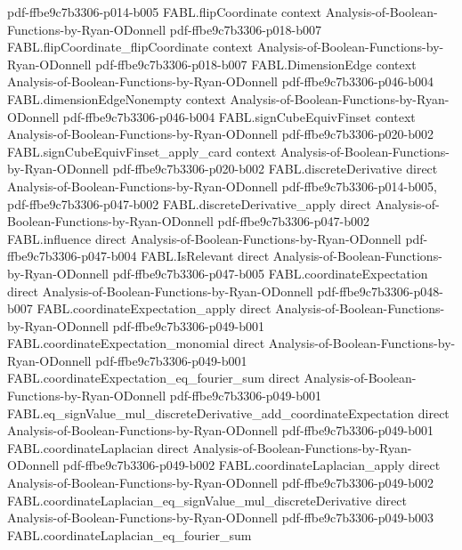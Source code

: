\begin{theorem}
  {pdf-ffbe9c7b3306-p014-b005}
\proofstep
  {FABL.flipCoordinate}
  {context}
  {Analysis-of-Boolean-Functions-by-Ryan-ODonnell}
  {pdf-ffbe9c7b3306-p018-b007}
\proofstep
  {FABL.flipCoordinate_flipCoordinate}
  {context}
  {Analysis-of-Boolean-Functions-by-Ryan-ODonnell}
  {pdf-ffbe9c7b3306-p018-b007}
\proofstep
  {FABL.DimensionEdge}
  {context}
  {Analysis-of-Boolean-Functions-by-Ryan-ODonnell}
  {pdf-ffbe9c7b3306-p046-b004}
\proofstep
  {FABL.dimensionEdgeNonempty}
  {context}
  {Analysis-of-Boolean-Functions-by-Ryan-ODonnell}
  {pdf-ffbe9c7b3306-p046-b004}
\proofstep
  {FABL.signCubeEquivFinset}
  {context}
  {Analysis-of-Boolean-Functions-by-Ryan-ODonnell}
  {pdf-ffbe9c7b3306-p020-b002}
\proofstep
  {FABL.signCubeEquivFinset_apply_card}
  {context}
  {Analysis-of-Boolean-Functions-by-Ryan-ODonnell}
  {pdf-ffbe9c7b3306-p020-b002}
\proofstep
  {FABL.discreteDerivative}
  {direct}
  {Analysis-of-Boolean-Functions-by-Ryan-ODonnell}
  {pdf-ffbe9c7b3306-p014-b005,
    pdf-ffbe9c7b3306-p047-b002}
\proofstep
  {FABL.discreteDerivative_apply}
  {direct}
  {Analysis-of-Boolean-Functions-by-Ryan-ODonnell}
  {pdf-ffbe9c7b3306-p047-b002}
\proofstep
  {FABL.influence}
  {direct}
  {Analysis-of-Boolean-Functions-by-Ryan-ODonnell}
  {pdf-ffbe9c7b3306-p047-b004}
\proofstep
  {FABL.IsRelevant}
  {direct}
  {Analysis-of-Boolean-Functions-by-Ryan-ODonnell}
  {pdf-ffbe9c7b3306-p047-b005}
\proofstep
  {FABL.coordinateExpectation}
  {direct}
  {Analysis-of-Boolean-Functions-by-Ryan-ODonnell}
  {pdf-ffbe9c7b3306-p048-b007}
\proofstep
  {FABL.coordinateExpectation_apply}
  {direct}
  {Analysis-of-Boolean-Functions-by-Ryan-ODonnell}
  {pdf-ffbe9c7b3306-p049-b001}
\proofstep
  {FABL.coordinateExpectation_monomial}
  {direct}
  {Analysis-of-Boolean-Functions-by-Ryan-ODonnell}
  {pdf-ffbe9c7b3306-p049-b001}
\proofstep
  {FABL.coordinateExpectation_eq_fourier_sum}
  {direct}
  {Analysis-of-Boolean-Functions-by-Ryan-ODonnell}
  {pdf-ffbe9c7b3306-p049-b001}
\proofstep
  {FABL.eq_signValue_mul_discreteDerivative_add_coordinateExpectation}
  {direct}
  {Analysis-of-Boolean-Functions-by-Ryan-ODonnell}
  {pdf-ffbe9c7b3306-p049-b001}
\proofstep
  {FABL.coordinateLaplacian}
  {direct}
  {Analysis-of-Boolean-Functions-by-Ryan-ODonnell}
  {pdf-ffbe9c7b3306-p049-b002}
\proofstep
  {FABL.coordinateLaplacian_apply}
  {direct}
  {Analysis-of-Boolean-Functions-by-Ryan-ODonnell}
  {pdf-ffbe9c7b3306-p049-b002}
\proofstep
  {FABL.coordinateLaplacian_eq_signValue_mul_discreteDerivative}
  {direct}
  {Analysis-of-Boolean-Functions-by-Ryan-ODonnell}
  {pdf-ffbe9c7b3306-p049-b003}
\proofstep
  {FABL.coordinateLaplacian_eq_fourier_sum}

\end{theorem}
